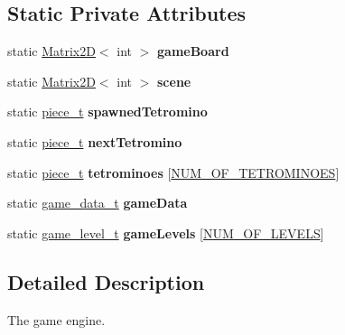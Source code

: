 \subsection*{Static Private Attributes}
\begin{DoxyCompactItemize}
\item 
\mbox{\label{classTetreesEngine_a37d082a7816d6731b2703dd6d1a1cb97}} 
static \hyperlink{classMatrix2D}{Matrix2D}$<$ int $>$ {\bfseries game\+Board}
\item 
\mbox{\label{classTetreesEngine_aeade477c0bc2eaaa894ebbdaca93584e}} 
static \hyperlink{classMatrix2D}{Matrix2D}$<$ int $>$ {\bfseries scene}
\item 
\mbox{\label{classTetreesEngine_a26435ee2f02d9ba70d9e359745114f6e}} 
static \hyperlink{structpiece__t}{piece\+\_\+t} {\bfseries spawned\+Tetromino}
\item 
\mbox{\label{classTetreesEngine_a44c902481f5d8a72ca8a78d24f5c3a33}} 
static \hyperlink{structpiece__t}{piece\+\_\+t} {\bfseries next\+Tetromino}
\item 
\mbox{\label{classTetreesEngine_a07ae13fb62e86b45c834947243a913df}} 
static \hyperlink{structpiece__t}{piece\+\_\+t} {\bfseries tetrominoes} \mbox{[}\hyperlink{TetreesDefs_8hpp_a69fa4aa1afe74f7f9ec42bf1e07ddf28}{N\+U\+M\+\_\+\+O\+F\+\_\+\+T\+E\+T\+R\+O\+M\+I\+N\+O\+ES}\mbox{]}
\item 
\mbox{\label{classTetreesEngine_afa356b8bb38e8918400e7175d6fbbd2e}} 
static \hyperlink{structgame__data__t}{game\+\_\+data\+\_\+t} {\bfseries game\+Data}
\item 
\mbox{\label{classTetreesEngine_a03ea87d7cefe7b216977c9123fc6ef60}} 
static \hyperlink{structgame__level__t}{game\+\_\+level\+\_\+t} {\bfseries game\+Levels} \mbox{[}\hyperlink{TetreesDefs_8hpp_a350a4204247d3562e237e289533cc31f}{N\+U\+M\+\_\+\+O\+F\+\_\+\+L\+E\+V\+E\+LS}\mbox{]}
\end{DoxyCompactItemize}


\subsection{Detailed Description}
The game engine. 

